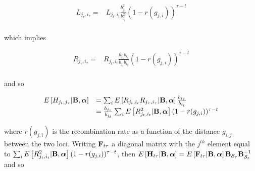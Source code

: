 \documentclass[12pt]{article}
\begin{document}
\begin{bibunit}
\begin{equation}
\begin{array}{rl}
L_{j_{\tau},i_{\tau}} =& L_{j_t,i_t}\frac{b_{j_\tau}^2}{b_{j_t}^2}(1-r(g_{j,i}))^{\tau-t}\\
\end{array}
\end{equation}

which implies

\begin{equation}
\begin{array}{rl}
R_{j_{\tau},i_{\tau}} =&R_{j_t,i_t}\frac{b_{j_\tau}b_{i_t}}{b_{j_t}b_{i_\tau}}(1-r(g_{j,i}))^{\tau-t}\\
\end{array}
\end{equation}

and so

\begin{equation}
\begin{array}{rl}
E\left[H_{j_t, j_\tau} | {\bf B}, \boldsymbol{\alpha}\right]
&=\sum_i E\left[R_{j_t,i_t}R_{j_{\tau},i_{\tau}} | {\bf B}, \boldsymbol{\alpha}\right]\frac{b_{i_\tau}}{b_{i_t}}\\
&=\frac{b_{j_\tau}}{b_{j_t}}\sum_i E\left[R_{j_t,i_t}^2 | {\bf B}, \boldsymbol{\alpha}\right](1-r(g_{j,i}))^{\tau-t}\\
\end{array}
\end{equation}


where $r(g_{j,i})$ is the recombination rate as a function of the distance $g_{i,j}$ between the two loci. Writing ${\bf F}_{t\tau}$ a diagonal matrix with the $j^{th}$ element equal to
$\sum_i E\left[R_{j_t,i_t}^2 | {\bf B}, \boldsymbol{\alpha}\right](1-r(g_{j,i}))^{\tau-t}$, then $E\left[{\bf H}_{t\tau} | {\bf B}, \boldsymbol{\alpha}\right]= E\left[{\bf F}_{t\tau} | {\bf B}, \boldsymbol{\alpha}\right]{\bf B}_{\mathcal{S}_\tau}{\bf B}_{\mathcal{S}_t}^{-1}$ and so


\end{bibunit}
\end{document}
